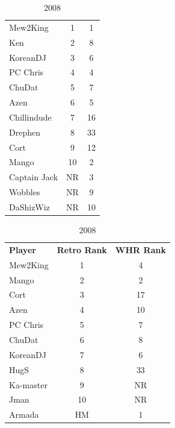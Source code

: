 \documentclass[10pt]{article}
\theoremstyle{definition}
\theoremstyle{remark}
\begin{document}
\begin{table}[!ht]
{\begin{tabular}{lcc}
    Mew2King        & 1                      & 1        \\
    Ken             & 2                      & 8        \\
    KoreanDJ        & 3                      & 6        \\
    PC Chris        & 4                      & 4        \\
    ChuDat          & 5                      & 7        \\
    Azen            & 6                      & 5        \\
    Chillindude     & 7                      & 16       \\
    Drephen         & 8                      & 33       \\
    Cort            & 9                      & 12       \\
    Mango           & 10                     & 2        \\
    Captain Jack    & NR                     & 3        \\
    Wobbles         & NR                     & 9        \\
    DaShizWiz       & NR                     & 10       \\
\end{tabular}
}
    \parbox{.33 \textwidth}{
        \centering
        \caption{2008}
\begin{tabular}{lcc}
    \textbf{Player} & \textbf{Retro Rank} & \textbf{WHR Rank} \\
    Mew2King        & 1                      & 4        \\
    Mango           & 2                      & 2        \\
    Cort            & 3                      & 17       \\
    Azen            & 4                      & 10       \\
    PC Chris        & 5                      & 7        \\
    ChuDat          & 6                      & 8        \\
    KoreanDJ        & 7                      & 6        \\
    HugS            & 8                      & 33       \\
    Ka-master       & 9                      & NR       \\
    Jman            & 10                     & NR       \\
    Armada          & HM                     & 1        \\

\end{tabular}}
\end{table}
\end{document}
